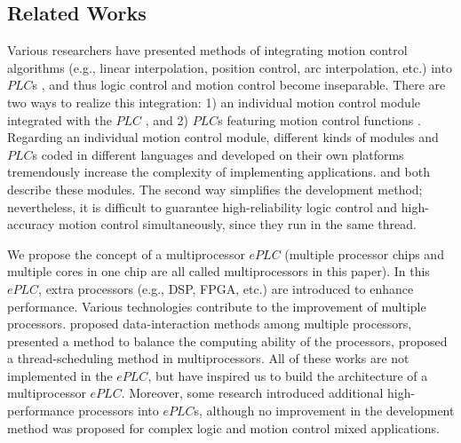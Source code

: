 \documentclass[journal,UTF8]{IEEEtran}
\begin{document}
	\subsection{Related Works}
	Various researchers have presented methods of integrating motion control algorithms (e.g., linear interpolation, position control, arc interpolation, etc.) into $PLC$s \cite{Ioannides2004Design,Shi2016The,Fang2017Design},  and thus logic control and motion control become inseparable. There are two ways to realize this integration: 1) an individual motion control module integrated with the $PLC$ \cite{Peng2011Linear}, and 2) $PLC$s featuring motion control functions \cite{Ioannides2004Design,syaichu2011model}. Regarding an individual motion control module, different kinds of modules and $PLC$s coded in different languages and developed on their own platforms tremendously increase the complexity of implementing applications. \cite{Peng2011Linear,Qian2014A}  and \cite{Panasonic2011Programmable} both describe these modules. The second way simplifies the development method; nevertheless, it is difficult to guarantee high-reliability logic control and high-accuracy motion control simultaneously, since they run in the same thread. 
	
	We propose the concept of a multiprocessor $ePLC$ (multiple processor chips and multiple cores in one chip are all called multiprocessors in this paper). In this $ePLC$, extra processors (e.g., DSP, FPGA, etc.) are introduced to enhance performance. Various technologies contribute to the improvement of multiple processors. \cite{Dubois2002Memory,Patel2006Processor} proposed data-interaction methods among multiple processors, \cite{Zhu2016Providing} presented a method to balance the computing ability of the processors, \cite{Albarakat2017MTB} proposed a thread-scheduling method in multiprocessors. All of these works are not implemented in the $ePLC$, but have inspired us to build the architecture of a multiprocessor $ePLC$. Moreover, some research \cite{Hajduk2015Architecture, Chmiel2016An} introduced additional high-performance processors into $ePLC$s, although no improvement in the development method was proposed for complex logic and motion control mixed applications.
	
\end{document}
